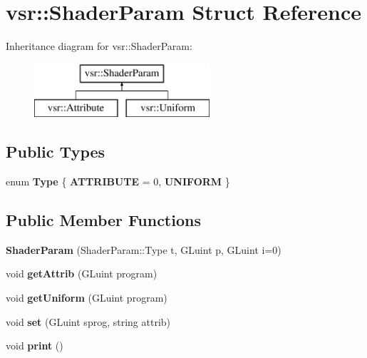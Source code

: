 \hypertarget{structvsr_1_1_shader_param}{\section{vsr\-:\-:Shader\-Param Struct Reference}
\label{structvsr_1_1_shader_param}
}
Inheritance diagram for vsr\-:\-:Shader\-Param\-:\begin{figure}[H]
\begin{center}
\leavevmode
\includegraphics[height=2.000000cm]{structvsr_1_1_shader_param}
\end{center}
\end{figure}
\subsection*{Public Types}
\begin{DoxyCompactItemize}
\item 
enum {\bfseries Type} \{ {\bfseries A\-T\-T\-R\-I\-B\-U\-T\-E} =  0, 
{\bfseries U\-N\-I\-F\-O\-R\-M}
 \}
\end{DoxyCompactItemize}
\subsection*{Public Member Functions}
\begin{DoxyCompactItemize}
\item 
\hypertarget{structvsr_1_1_shader_param_a1e8a39780386645ad717f1caa725657e}{{\bfseries Shader\-Param} (Shader\-Param\-::\-Type t, G\-Luint p, G\-Luint i=0)}\label{structvsr_1_1_shader_param_a1e8a39780386645ad717f1caa725657e}

\item 
\hypertarget{structvsr_1_1_shader_param_a15b1f0c893bf029a31163c00c540a47b}{void {\bfseries get\-Attrib} (G\-Luint program)}\label{structvsr_1_1_shader_param_a15b1f0c893bf029a31163c00c540a47b}

\item 
\hypertarget{structvsr_1_1_shader_param_ae7aeaedee6379d6b7cf0b7f0cd5bf132}{void {\bfseries get\-Uniform} (G\-Luint program)}\label{structvsr_1_1_shader_param_ae7aeaedee6379d6b7cf0b7f0cd5bf132}

\item 
\hypertarget{structvsr_1_1_shader_param_a518a3a6ff5afcca3d2ae22b61dae98b4}{void {\bfseries set} (G\-Luint sprog, string attrib)}\label{structvsr_1_1_shader_param_a518a3a6ff5afcca3d2ae22b61dae98b4}

\item 
\hypertarget{structvsr_1_1_shader_param_a8539b3034b04110ba23699e1ee6e72de}{void {\bfseries print} ()}\label{structvsr_1_1_shader_param_a8539b3034b04110ba23699e1ee6e72de}

\end{DoxyCompactItemize}
